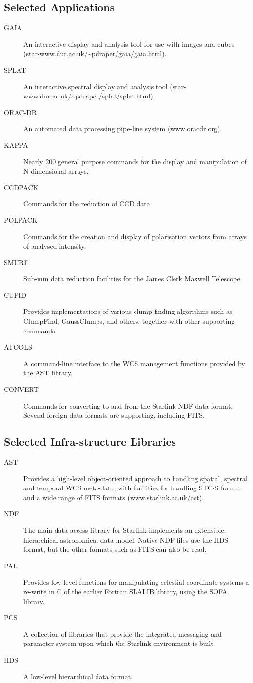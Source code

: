 \subsection{Selected Applications}
\begin{description}
\item[GAIA] An interactive display and analysis tool for use with images and
cubes (\url{star-www.dur.ac.uk/~pdraper/gaia/gaia.html}).
\item[SPLAT] An interactive spectral display and analysis tool (\url{star-www.dur.ac.uk/~pdraper/splat/splat.html}).
\item[ORAC-DR] An automated data processing pipe-line system
(\url{www.oracdr.org}).
\item[KAPPA] Nearly 200 general purpose commands for the display and manipulation of N-dimensional arrays.
\item[CCDPACK] Commands for the reduction of CCD data.
\item[POLPACK] Commands for the creation and display of polarisation vectors from arrays of analysed intensity.
\item[SMURF] Sub-mm data reduction facilities for the James Clerk Maxwell Telescope.
\item[CUPID] Provides implementations of various clump-finding algorithms such as ClumpFind, GaussClumps, and others, together with other supporting commands.
\item[ATOOLS] A command-line interface to the WCS management functions provided by the AST library.
\item[CONVERT] Commands for converting to and from the Starlink NDF data format. Several foreign data formats are supporting, including FITS.
\end{description}

\subsection{Selected Infra-structure Libraries}
\begin{description}
\item[AST] Provides a high-level object-oriented approach to handling
spatial, spectral and temporal WCS meta-data, with facilities for
handling STC-S format and a wide range of FITS formats
(\url{www.starlink.ac.uk/ast}).

\item[NDF] The main data access library for Starlink-implements an extensible, hierarchical astronomical data model. Native NDF files use the HDS format, but the other formats such as FITS can also be read.
\item[PAL] Provides low-level functions for manipulating celestial coordinate systems-a re-write in C of the earlier Fortran SLALIB library, using the SOFA library.
\item[PCS] A collection of libraries that provide the integrated messaging and parameter system upon which the Starlink environment is built.
\item[HDS] A low-level hierarchical data format.
\end{description}

